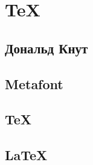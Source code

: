 \section{\TeX}
\subsection{Дональд Кнут}
\subsection{Metafont}
\subsection{\TeX}
\subsection{\LaTeX}

\newpage

